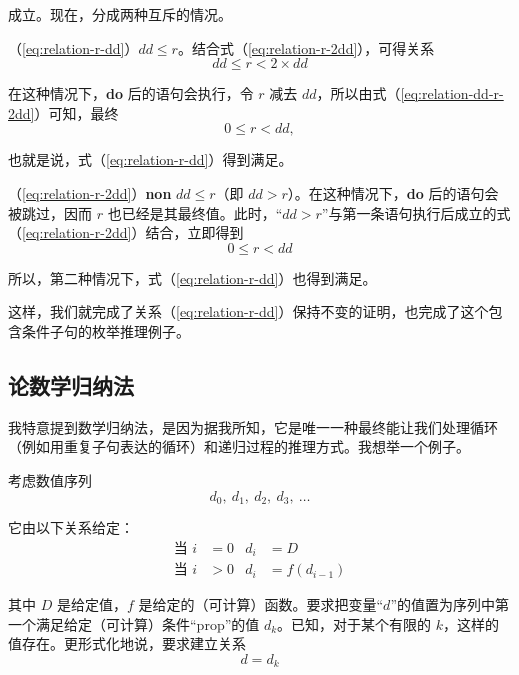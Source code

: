 \noindent
成立。现在，分成两种互斥的情况。

（\ref{eq:relation-r-dd}）$dd \leqslant r$。结合式（\ref{eq:relation-r-2dd}），可得关系
\begin{equation}
	\label{eq:relation-dd-r-2dd}
	dd \leqslant r < 2\times dd
\end{equation}

\noindent
在这种情况下，\textbf{do} 后的语句会执行，令 $r$ 减去 $dd$，所以由式（\ref{eq:relation-dd-r-2dd}）可知，最终
\begin{equation*}
	0 \leqslant r < dd,
\end{equation*}

\noindent
也就是说，式（\ref{eq:relation-r-dd}）得到满足。

（\ref{eq:relation-r-2dd}）\textbf{non} $dd \leqslant r$（即 $dd > r$）。在这种情况下，\textbf{do} 后的语句会被跳过，因而 $r$ 也已经是其最终值。此时，“$dd > r$”与第一条语句执行后成立的式（\ref{eq:relation-r-2dd}）结合，立即得到
\begin{equation*}
	0 \leqslant r < dd
\end{equation*}

\noindent
所以，第二种情况下，式（\ref{eq:relation-r-dd}）也得到满足。

这样，我们就完成了关系（\ref{eq:relation-r-dd}）保持不变的证明，也完成了这个包含条件子句的枚举推理例子。

\subsection{论数学归纳法}
\label{subsec:mathematical-induction}

我特意提到数学归纳法，是因为据我所知，它是唯一一种最终能让我们处理循环（例如用重复子句表达的循环）和递归过程的推理方式。我想举一个例子。

考虑数值序列
\begin{equation}
	\label{eq:induction-d}
	d_0,\ d_1,\ d_2,\ d_3,\ \dotso
\end{equation}

\noindent
它由以下关系给定：
\begin{subequations}
\begin{align}
	\label{eq:induction-for-a}
	\text{当 } i &= 0 & d_i &= D \\
	\label{eq:induction-for-b}
	\text{当 } i &> 0 & d_i &= f(d_{i-1})
\end{align}
\end{subequations}

\noindent
其中 $D$ 是给定值，$f$ 是给定的（可计算）函数。要求把变量“$d$”的值置为序列中第一个满足给定（可计算）条件“prop”的值 $d_k$。已知，对于某个有限的 $k$，这样的值存在。更形式化地说，要求建立关系
\begin{equation}
	\label{eq:induction-dk}
	d=d_k
\end{equation}

